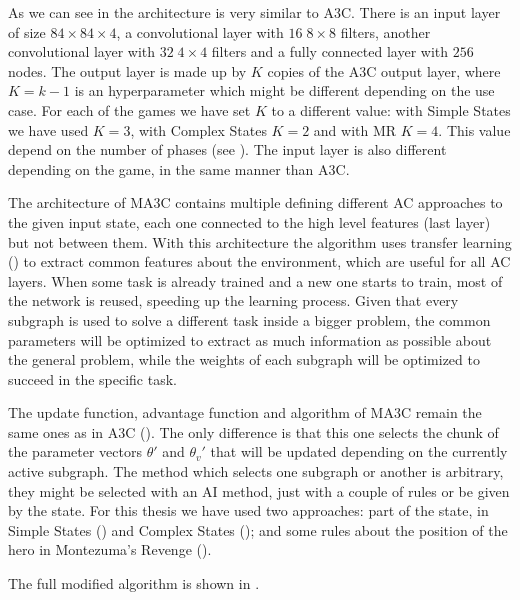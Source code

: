 As we can see in  the architecture is very similar to \ac{A3C}.
There is an input layer of size $84 \times 84 \times 4$, a convolutional layer with $16\; 8 \times 8$ filters, another
convolutional layer with $32 \; 4 \times 4$ filters and a fully connected layer with $256$ nodes.
The output layer is made up by $K$ copies of the \ac{A3C} output layer, where $K = k-1$ is an hyperparameter which might be
different depending on the use case.
For each of the games we have set $K$ to a different value: with Simple States we have used $K=3$, with Complex States
$K=2$ and with \ac{MR} $K=4$.
This value depend on the number of phases (see ).
The input layer is also different depending on the game, in the same manner than \ac{A3C}.

The architecture of \ac{MA3C} contains multiple  defining different \acl{AC} approaches to the given input state,
each one connected to the high level features (last layer) but not between them.
With this architecture the algorithm uses transfer learning () to extract common features
about the environment, which are useful for all \ac{AC} layers.
When some task is already trained and a new one starts to train, most of the network is reused, speeding up the learning
process.
Given that every subgraph is used to solve a different task inside a bigger problem, the common parameters will be optimized to
extract as much information as possible about the general problem, while the weights of each subgraph will be optimized to
succeed in the specific task.

The update function, advantage function and algorithm of \ac{MA3C} remain the same ones as in \ac{A3C} ().
The only difference is that this one selects the chunk of the parameter vectors $\theta'$ and $\theta_{v}'$ that will be updated
depending on the currently active subgraph.
The method which selects one subgraph or another is arbitrary, they might be selected with an \ac{AI} method, just
with a couple of rules or be given by the state.
For this thesis we have used two approaches: part of the state, in Simple States () and Complex States
(); and some rules about the position of the hero in Montezuma's Revenge ().

The full modified algorithm is shown in .

